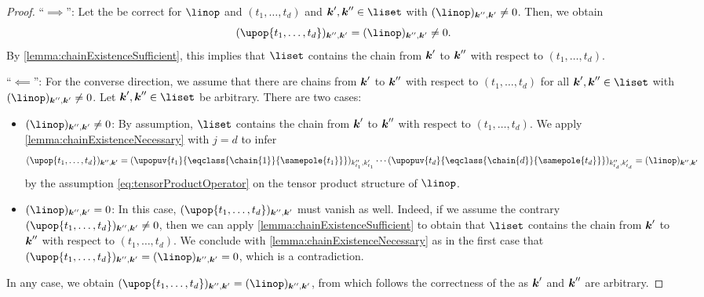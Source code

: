 \vspace*{1em}
\pagebreak

\propCorrectnessUPCharacterization*

\begin{proof}
  ``$\implies$'':
  Let the \up be correct for $\linop$ and $(t_1, \dotsc, t_d)$
  and $\*k', \*k'' \in \liset$ with $(\linop)_{\*k'',\*k'} \not= 0$.
  Then, we obtain
  \begin{equation}
    (\upop{t_1,\dotsc,t_d})_{\*k'',\*k'}
    = (\linop)_{\*k'',\*k'}
    \not= 0.
  \end{equation}
  By \cref{lemma:chainExistenceSufficient},
  this implies that $\liset$ contains the chain from ${\boldsymbol{k}}'$ to ${\boldsymbol{k}}''$
  with respect to $(t_1, \dotsc, t_d)$.
  
  ``$\impliedby$'':
  For the converse direction, we assume that there are chains
  from ${\boldsymbol{k}}'$ to ${\boldsymbol{k}}''$ with respect to $(t_1, \dotsc, t_d)$
  for all $\*k', \*k'' \in \liset$ with $(\linop)_{\*k'',\*k'} \not= 0$.
  Let $\*k', \*k'' \in \liset$ be arbitrary.
  There are two cases:
  \begin{itemize}
    \item
    ${(\linop)_{\*k'',\*k'} \not= 0}$:
    By assumption, $\liset$ contains the chain from ${\boldsymbol{k}}'$ to ${\boldsymbol{k}}''$
    with respect to $(t_1, \dotsc, t_d)$.
    We apply \cref{lemma:chainExistenceNecessary} with $j = d$
    to infer
    \begin{equation}
      (\upop{t_1,\dotsc,t_d})_{\*k'',\*k'}
      =
      (\upopuv{t_1}{\eqclass{\chain{1}}{\samepole{t_1}}})_{k''_{t_1},k'_{t_1}}
      \dotsm
      (\upopuv{t_d}{\eqclass{\chain{d}}{\samepole{t_d}}})_{k''_{t_d},k'_{t_d}}
      = (\linop)_{\*k'',\*k'}
    \end{equation}
    by the assumption \eqref{eq:tensorProductOperator} on
    the tensor product structure of $\linop$.
    
    \item
    ${(\linop)_{\*k'',\*k'} = 0}$:
    In this case, $(\upop{t_1,\dotsc,t_d})_{\*k'',\*k'}$ must vanish as well.
    Indeed, if we assume the contrary
    $(\upop{t_1,\dotsc,t_d})_{\*k'',\*k'} \not= 0$,
    then we can apply \cref{lemma:chainExistenceSufficient}
    to obtain that $\liset$ contains the chain from ${\boldsymbol{k}}'$ to ${\boldsymbol{k}}''$
    with respect to $(t_1, \dotsc, t_d)$.
    We conclude with \cref{lemma:chainExistenceNecessary} as in the first case
    that $(\upop{t_1,\dotsc,t_d})_{\*k'',\*k'} = (\linop)_{\*k'',\*k'} = 0$,
    which is a contradiction.
  \end{itemize}
  In any case, we obtain
  $(\upop{t_1,\dotsc,t_d})_{\*k'',\*k'} = (\linop)_{\*k'',\*k'}$,
  from which follows the correctness of the \up\punctfix{,}
  as ${\boldsymbol{k}}'$ and ${\boldsymbol{k}}''$ are arbitrary.
\end{proof}



